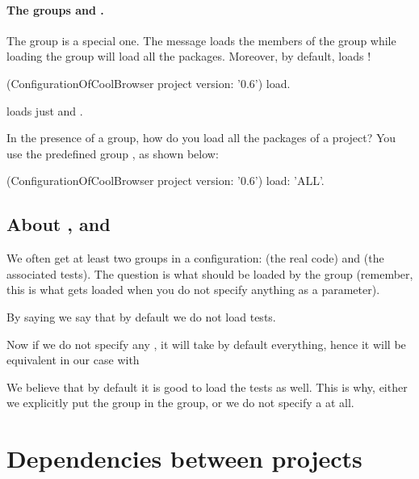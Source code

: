 \documentclass[a4paper,10pt,twoside]{book}
\begin{document}
\paragraph{The groups  and .}
The  group is a special one.  The  message loads the members of the  group while loading the  group will load all the packages. Moreover, by default,  loads !


\begin{code}{}
(ConfigurationOfCoolBrowser project version: '0.6') load.
\end{code}

\noindent
loads just  and .

In the presence of a  group, how do you load all the packages of a project?  You use the predefined   group , as shown below:

\begin{code}{}
(ConfigurationOfCoolBrowser project version: '0.6') load: 'ALL'.
\end{code}

\subsection{About ,  and }

We often get at least two groups in a configuration:  (the real code) and  (the associated tests).  The question is what should be loaded by the  group (remember, this is what gets loaded when you do not specify anything as a parameter).

By saying  we say that by default we do not load tests.

Now if we do not specify any , it will take by default everything, hence it will be equivalent in our case with 

We believe that by default it is good to load the tests as well. This is why, either we explicitly put the  group in the  group, or we do not specify a  at all.



\section{Dependencies between projects}
\end{document}
